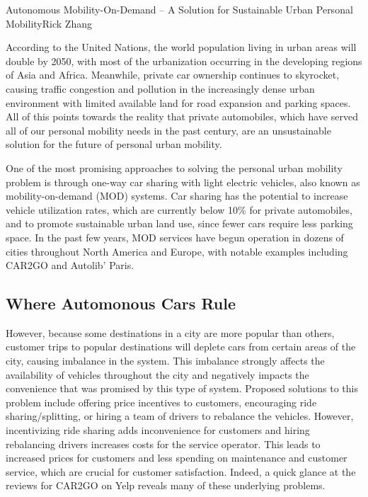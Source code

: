 \documentclass{papertex}
\begin{document}
\begin{news}{2}{Autonomous Mobility-On-Demand – A Solution for Sustainable Urban Personal Mobility}{Rick Zhang}{}{}

According to the United Nations, the world population living in urban areas 
will double by 2050, with most of the urbanization occurring in the developing 
regions of Asia and Africa. Meanwhile, private car ownership continues to 
skyrocket, causing traffic congestion and pollution in the increasingly dense 
urban environment with limited available land for road expansion and parking 
spaces. All of this points towards the reality that private automobiles, which 
have served all of our personal mobility needs in the past century, are an 
unsustainable solution for the future of personal urban mobility.

One of the most promising approaches to solving the personal urban mobility 
problem is through one-way car sharing with light electric vehicles, also 
known as mobility-on-demand (MOD) systems. Car sharing has the potential to 
increase vehicle utilization rates, which are currently below 10\% for 
private automobiles, and to promote sustainable urban land use, since fewer 
cars require less parking space. In the past few years, MOD services have 
begun operation in dozens of cities throughout North America and Europe, with 
notable examples including CAR2GO and Autolib’ Paris.

\subsection*{\textbf{Where Automonous Cars Rule}}

However, because some destinations in a city are more popular than others, 
customer trips to popular destinations will deplete cars from certain areas of 
the city, causing imbalance in the system. This imbalance strongly affects the 
availability of vehicles throughout the city and negatively impacts the 
convenience that was promised by this type of system. Proposed solutions to 
this problem include offering price incentives to customers, encouraging ride 
sharing/splitting, or hiring a team of drivers to rebalance the vehicles. 
However, incentivizing ride sharing adds inconvenience for customers and 
hiring rebalancing drivers increases costs for the service operator. This 
leads to increased prices for customers and less spending on maintenance and 
customer service, which are crucial for customer satisfaction. Indeed, a quick 
glance at the reviews for CAR2GO on Yelp reveals many of these underlying 
problems.


\end{news}
\end{document}
